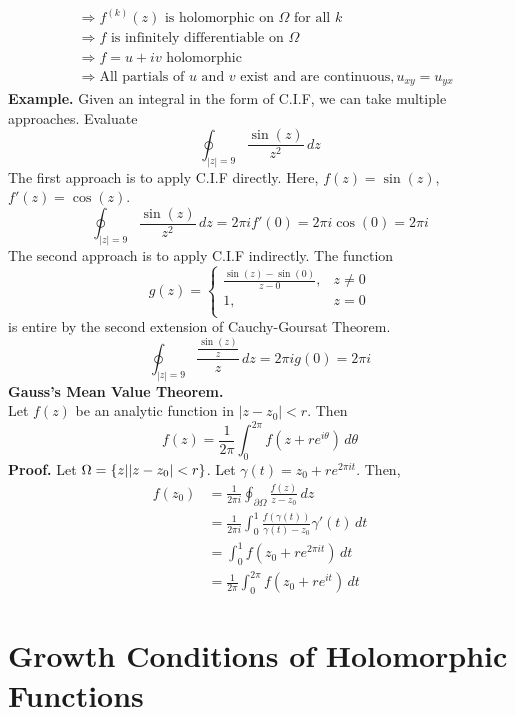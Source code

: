 \documentclass[11pt]{article}
\DeclarePairedDelimiter\abs{\lvert}{\rvert}
\begin{document}
\begin{align*}
&\Rightarrow f^{(k)}(z) \mbox{ is holomorphic on } \Omega \mbox{ for all } k \\ 
&\Rightarrow f \mbox{ is infinitely differentiable on } \Omega \\ 
&\Rightarrow f = u + iv \mbox{ holomorphic } \\
&\Rightarrow \mbox{All partials of } u \mbox{ and } v \mbox{ exist and are continuous}, u_{xy} = u_{yx} 
\end{align*}
\newline
\textbf{Example.} Given an integral in the form of C.I.F, we can take multiple approaches. Evaluate 
$$\oint_{|z| = 9} \frac{\sin(z)}{z^2} \,dz$$
The first approach is to apply C.I.F directly. Here, $f(z) = \sin(z)$, $f'(z) = \cos(z)$. 
$$ \oint_{|z| = 9} \frac{\sin(z)}{z^2} \,dz = 2\pi i f'(0) = 2\pi i \cos(0) = 2\pi i$$
The second approach is to apply C.I.F indirectly. The function
$$
g(z) = 
\begin{cases} 
	\frac{\sin(z) - \sin(0)}{z - 0}, &z \neq 0 \\
	1, &z = 0\\
\end{cases}
$$
is entire by the second extension of Cauchy-Goursat Theorem. 
$$\oint_{|z| = 9} \frac{\frac{\sin(z)}{z}}{z} \,dz = 2\pi i g(0) = 2\pi i$$
\newline
\textbf{Gauss's Mean Value Theorem.} \\
Let $f(z)$ be an analytic function in $|z - z_0| < r$. Then 
$$f(z) = \frac{1}{2\pi}\int_0^{2\pi} f\left(z + re^{i\theta}\right) \,d\theta$$ 
\textbf{Proof.} Let $\Omega = \{z|\abs{z - z_0} < r\}$. Let $\gamma(t) = z_0 + re^{2\pi i t}$. Then, 
\begin{align*}
f(z_0) &= \frac{1}{2\pi i} \oint_{\partial \Omega} \frac{f(z)}{z - z_0} \,dz \\
&= \frac{1}{2\pi i }\int_0^1 \frac{f(\gamma(t))}{\gamma(t) - z_0} \gamma'(t) \, dt \\
&= \int_0^1 f\left(z_0 + re^{2\pi it}\right) \,dt \\ 
&= \frac{1}{2\pi}\int_0^{2\pi} f\left(z_0 + re^{it}\right) \,dt
\end{align*}

\newpage
\section{Growth Conditions of Holomorphic Functions}
\end{document}

